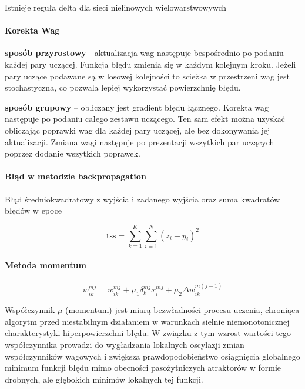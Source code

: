 Istnieje reguła delta dla sieci nielinowych wielowarstwowywch

\paragraph{Korekta Wag}

\textbf{sposób przyrostowy} - aktualizacja wag następuje bespośrednio po
podaniu każdej pary uczącej. Funkcja błędu zmienia się w każdym
kolejnym kroku. Jeżeli pary uczące podawane są w losowej kolejności
to scieżka w przestrzeni wag jest stochastyczna, co pozwala lepiej
wykorzystać powierzchnię błędu.

\textbf{sposób grupowy} – obliczany jest gradient błędu łącznego. Korekta wag
następuje po podaniu całego zestawu uczącego. Ten sam efekt można
uzyskać obliczając poprawki wag dla każdej pary uczącej, ale bez
dokonywania jej aktualizacji. Zmiana wagi następuje po prezentacji
wszytkich par uczących poprzez dodanie wszytkich poprawek.

\paragraph{Błąd w metodzie backpropagation}

Błąd średniokwadratowy z wyjścia i zadanego wyjścia oraz suma kwadratów błędów w epoce

\begin{equation}
 \text{tss} = \sum_{k=1}^K \sum_{i=1}^N {(z_i - y_i)}^2
\end{equation}

\paragraph{Metoda momentum}

\begin{equation}
 w_{ik}^{mj} = w_{ik}^{mj} + \mu_1 \delta_k^{mj} x_i^{mj} + \mu_2 \Delta w_{ik}^{m(j-1)}
\end{equation}

Współczynnik $\mu$ (momentum) jest miarą bezwładności procesu uczenia, chroniąca algorytm
przed niestabilnym działaniem w warunkach sielnie niemonotonicznej charakterystyki hiperpowierzchni błędu.
W związku z tym wzrost wartości tego współczynnika prowadzi do wygładzania lokalnych oscylazji zmian współczynników
wagowych i zwiększa prawdopodobieństwo osiągnięcia globalnego minimum funkcji błędu mimo obecności
pasożytniczych atraktorów w formie drobnych, ale głębokich minimów lokalnych tej funkcji.


